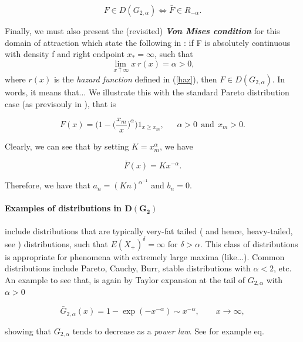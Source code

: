 \documentclass[11pt,a4paper,openany ]{book}
\begin{document}
\begin{equation*}
F\in D(G_{2,\alpha})\Longleftrightarrow \bar{F}\in R_{-\alpha}.
\end{equation*}


Finally, we must also present the (revisited) \emph{\textbf{Von Mises condition}} for this domain of attraction which state the following in \cite{falk_von_1993} : if F is absolutely continuous with density f and right endpoint $x_*=\infty$, such that 
\begin{equation*}
\displaystyle{\lim_{ \ x \uparrow \infty}} x \ r(x)=\alpha>0,
\end{equation*}
where $r(x)$ is the \emph{hazard function} defined in (\ref{haz}),
then $F\in D(G_{2,\alpha})$. In words, it means that...
We illustrate this with the standard Pareto distribution case (as previsouly in ), that is 

\begin{equation*}
F(x)=\bigg(1-\big(\frac{x_m}{x}\big)^{\alpha}\bigg)1_{x\geq x_m}, \ \ \ \ \ \ \ \alpha>0 \  \ \text{and} \ \ x_m>0.
\end{equation*}

Clearly, we can see that by setting $K=x_m^{\alpha}$, we have

\begin{equation*}
\bar{F}(x)=Kx^{-\alpha}.
\end{equation*}

Therefore, we have that $a_n=(Kn)^{\alpha^{-1}}$ and $b_n=0$.

\paragraph*{Examples of distributions in $\boldsymbol{D(G_{2})}$} include distributions that are typically very-fat tailed ( and hence, heavy-tailed, see ) distributions, such that $E(X_+)^{\delta}=\infty$ for $\delta>\alpha$. This class of distributions is appropriate for phenomena with extremely large maxima (like...). \cite{domain of attraction course} Common distributions include Pareto, Cauchy, Burr, stable distributions with $\alpha<2$, etc.
An example to see that, is again by Taylor expansion at the tail of $G_{2,\alpha}$ with $\alpha>0$ 

\begin{equation}
\bar{G}_{2,\alpha}(x)=1-\exp(-x^{-\alpha})\sim x^{-\alpha}, \ \ \ \ \ \ \ \ \ x\to\infty,
\end{equation}

showing that $G_{2,\alpha}$ tends to decrease as a \emph{power law}.
See for example eq.
\end{document}
